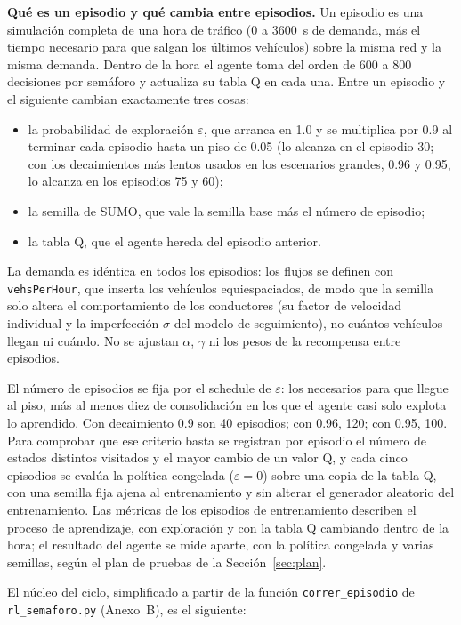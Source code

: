 \noindent\textbf{Qué es un episodio y qué cambia entre episodios.}
Un episodio es una simulación completa de una hora de tráfico (0 a
3600~s de demanda, más el tiempo necesario para que salgan los últimos
vehículos) sobre la misma red y la misma demanda. Dentro de la hora el
agente toma del orden de 600 a 800 decisiones por semáforo y actualiza
su tabla Q en cada una. Entre un episodio y el siguiente cambian
exactamente tres cosas:

\begin{itemize}
  \item la probabilidad de exploración $\varepsilon$, que arranca en 1.0
    y se multiplica por 0.9 al terminar cada episodio hasta un piso de
    0.05 (lo alcanza en el episodio 30; con los decaimientos más lentos
    usados en los escenarios grandes, 0.96 y 0.95, lo alcanza en los
    episodios 75 y 60);
  \item la semilla de SUMO, que vale la semilla base más el número de
    episodio;
  \item la tabla Q, que el agente hereda del episodio anterior.
\end{itemize}

La demanda es idéntica en todos los episodios: los flujos se definen
con \verb|vehsPerHour|, que inserta los vehículos equiespaciados, de
modo que la semilla solo altera el comportamiento de los conductores
(su factor de velocidad individual y la imperfección $\sigma$ del modelo
de seguimiento), no cuántos vehículos llegan ni cuándo. No se ajustan
$\alpha$, $\gamma$ ni los pesos de la recompensa entre episodios.

El número de episodios se fija por el schedule de $\varepsilon$: los
necesarios para que llegue al piso, más al menos diez de consolidación
en los que el agente casi solo explota lo aprendido. Con decaimiento
0.9 son 40 episodios; con 0.96, 120; con 0.95, 100. Para comprobar que
ese criterio basta se registran por episodio el número de estados
distintos visitados y el mayor cambio de un valor Q, y cada cinco
episodios se evalúa la política congelada ($\varepsilon = 0$) sobre una
copia de la tabla Q, con una semilla fija ajena al entrenamiento y sin
alterar el generador aleatorio del entrenamiento. Las métricas de los
episodios de entrenamiento describen el proceso de aprendizaje, con
exploración y con la tabla Q cambiando dentro de la hora; el resultado
del agente se mide aparte, con la política congelada y varias semillas,
según el plan de pruebas de la Sección~\ref{sec:plan}.

El núcleo del ciclo, simplificado a partir de la función
\texttt{correr\_episodio} de \texttt{rl\_semaforo.py} (Anexo~B), es el
siguiente:


